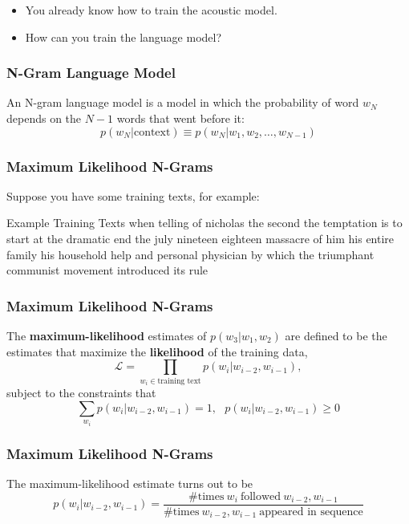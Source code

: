 \documentclass{beamer}
\begin{document}
\begin{frame}
  \begin{itemize}
  \item You already know how to train the acoustic model.
  \item How can you train the language model?
  \end{itemize}
\end{frame}

\begin{frame}
  \frametitle{N-Gram Language Model}

  An N-gram language model is a model in which the probability of word
  $w_N$ depends on the $N-1$ words that went before it:
  \begin{displaymath}
    p(w_N|\mbox{context}) \equiv p(w_N|w_1,w_2,\ldots,w_{N-1})
  \end{displaymath}
\end{frame}

\begin{frame}
  \frametitle{Maximum Likelihood N-Grams}

  Suppose you have some training texts, for example:
  \begin{block}{Example Training Texts}
    when telling of nicholas the second the
    temptation is to start at the dramatic end the july nineteen eighteen
    massacre of him his entire family his household help and personal
    physician by which the triumphant communist movement introduced its
    rule
  \end{block}
\end{frame}

\begin{frame}
  \frametitle{Maximum Likelihood N-Grams}

  The {\bf maximum-likelihood} estimates of $p(w_3|w_1,w_2)$ are
  defined to be the estimates that maximize the {\bf likelihood} of
  the training data,
  \begin{displaymath}
    {\mathcal L}=\prod_{w_i\in \mbox{training text}} p(w_i|w_{i-2},w_{i-1}),
  \end{displaymath}
  subject to the constraints that
  \begin{displaymath}
    \sum_{w_i} p(w_i|w_{i-2},w_{i-1})=1,~~~p(w_i|w_{i-2},w_{i-1})\ge 0
  \end{displaymath}
\end{frame}

\begin{frame}
  \frametitle{Maximum Likelihood N-Grams}

  The maximum-likelihood estimate turns  out to be
  \begin{displaymath}
    p(w_i|w_{i-2},w_{i-1})=
    \frac{\mbox{\# times}~w_i~\mbox{followed}~w_{i-2},w_{i-1}}{\mbox{\# times}~w_{i-2},w_{i-1}~\mbox{appeared in sequence}}
  \end{displaymath}
\end{frame}
\end{document}
